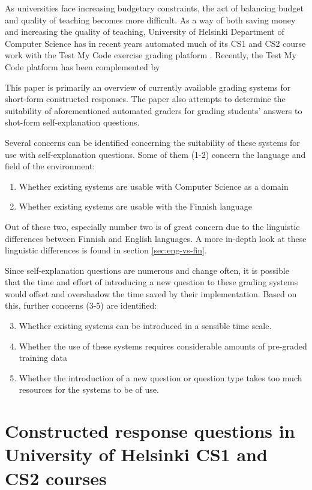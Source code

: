 \documentclass[english]{tktltiki2}
\theoremstyle{definition}
\theoremstyle{remark}
\begin{document}
As universities face increasing budgetary constraints, the act of balancing budget and quality of teaching becomes more difficult. 
As a way of both saving money and increasing the quality of teaching, University of Helsinki Department of Computer Science has in recent years automated much of its CS1 and CS2 course work with the Test My Code exercise grading platform \cite{vihavainen13}.
Recently, the Test My Code platform has been complemented by 

This paper is primarily an overview of currently available grading systems for short-form constructed responses.
The paper also attempts to determine the suitability of aforementioned automated graders for grading students' answers to shot-form self-explanation questions.

Several concerns can be identified concerning the suitability of these systems for use with self-explanation questions. Some of them (1-2) concern the language and field of the environment:
\begin{enumerate}
	\item Whether existing systems are usable with Computer Science as a domain
	\item Whether existing systems are usable with the Finnish language
\end{enumerate}

Out of these two, especially number two is of great concern due to the linguistic differences between Finnish  and English languages. A more in-depth look at these linguistic differences is found in section \ref{sec:eng-vs-fin}.

Since self-explanation questions are numerous and change often, it is possible that the time and effort of introducing a new question to these grading systems would offset and overshadow the time saved by their implementation. Based on this, further concerns (3-5) are identified:
\begin{enumerate}
	\setcounter{enumi}{2}
	\item Whether existing systems can be introduced in a sensible time scale.
	\item Whether the use of these systems requires considerable amounts of pre-graded training data
	\item Whether the introduction of a new question or question type takes too much resources for the systems to be of use.
\end{enumerate}

\section{Constructed response questions in University of Helsinki CS1 and CS2 courses}
\end{document}
